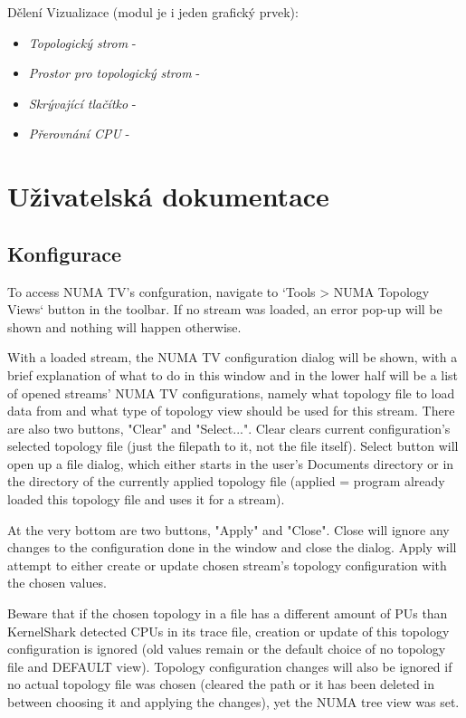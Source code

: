 Dělení Vizualizace (modul je i jeden grafický prvek):
\begin{itemize}
    \item \emph{Topologický strom} -
    \item \emph{Prostor pro topologický strom} -
    \item \emph{Skrývající tlačítko} -
    \item \emph{Přerovnání CPU} -
\end{itemize}

\section{Uživatelská dokumentace}

\begin{code}

\subsection{Konfigurace}

To access NUMA TV's confguration, navigate to `Tools > NUMA Topology Views`
button in the toolbar. If no stream was loaded, an error pop-up will be shown
and nothing will happen otherwise.

With a loaded stream, the NUMA TV configuration dialog will be shown,
with a brief explanation of what to do in this window and in the lower half will be
a list of opened streams' NUMA TV configurations, namely what topology file to
load data from and what type of topology view should be used for this stream.
There are also two buttons, "Clear" and "Select...". Clear clears current
configuration's selected topology file (just the filepath to it, not the file
itself). Select button will open up a file dialog, which either starts in the user's
Documents directory or in the directory of the currently applied topology file
(applied = program already loaded this topology file and uses it for a stream).

At the very bottom are two buttons, "Apply" and "Close". Close will ignore any
changes to the configuration done in the window and close the dialog. Apply will
attempt to either create or update chosen stream's topology configuration with
the chosen values.

Beware that if the chosen topology in a file has a different amount of PUs than
KernelShark detected CPUs in its trace file, creation or update of this topology
configuration is ignored (old values remain or the default choice of no topology
file and DEFAULT view). Topology configuration changes will also be ignored if
no actual topology file was chosen (cleared the path or it has been deleted in
between choosing it and applying the changes), yet the NUMA tree view was set.


\end{code}
